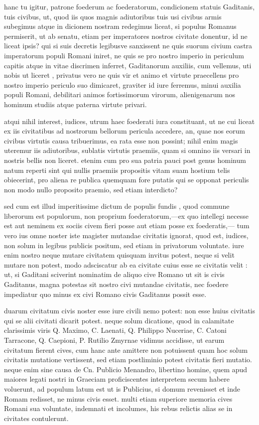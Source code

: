  hanc tu igitur, patrone foederum ac foederatorum, condicionem statuis Gaditanis, tuis civibus, ut, quod iis quos magnis adiutoribus tuis usi civibus armis subegimus atque in dicionem nostram redegimus liceat, si populus Romanus permiserit, ut ab senatu, etiam per imperatores nostros civitate donentur, id ne liceat ipsis? qui si suis decretis legibusve sanxissent ne quis suorum civium castra imperatorum populi Romani iniret, ne quis se pro nostro imperio in periculum capitis atque in vitae discrimen inferret, Gaditanorum auxiliis, cum vellemus, uti nobis ut liceret , privatus vero ne quis vir et animo et virtute praecellens pro nostro imperio periculo suo dimicaret, graviter id iure ferremus, minui auxilia populi Romani, debilitari animos fortissimorum virorum, alienigenarum nos hominum studiis atque paterna virtute privari.

 atqui nihil interest, iudices, utrum haec foederati iura constituant, ut ne cui liceat ex iis civitatibus ad nostrorum bellorum pericula accedere, an, quae nos eorum civibus virtutis causa tribuerimus, ea rata esse non possint; nihil enim magis uteremur iis adiutoribus, sublatis virtutis praemiis, quam si omnino iis versari in nostris bellis non liceret. etenim cum pro sua patria pauci post genus hominum natum reperti sint qui nullis praemiis propositis vitam suam hostium telis obiecerint, pro aliena re publica quemquam fore putatis qui se opponat periculis non modo nullo proposito praemio, sed etiam interdicto?

 sed cum est illud imperitissime dictum de populis fundis , quod commune liberorum est populorum, non proprium foederatorum,—ex quo intellegi necesse est aut neminem ex sociis civem fieri posse aut etiam posse ex foederatis,— tum vero ius omne noster iste magister mutandae civitatis ignorat, quod est, iudices, non solum in legibus publicis positum, sed etiam in privatorum voluntate. iure enim nostro neque mutare civitatem quisquam invitus potest, neque si velit mutare non potest, modo adsciscatur ab ea civitate cuius esse se civitatis velit : ut, si Gaditani sciverint nominatim de aliquo cive Romano ut sit is civis Gaditanus, magna potestas sit nostro civi mutandae civitatis, nec foedere impediatur quo minus ex civi Romano civis Gaditanus possit esse.

 duarum civitatum civis noster esse iure civili nemo potest: non esse huius civitatis qui se alii civitati dicarit potest. neque solum dicatione, quod in calamitate clarissimis viris Q. Maximo, C. Laenati, Q. Philippo Nuceriae, C. Catoni Tarracone, Q. Caepioni, P. Rutilio Zmyrnae vidimus accidisse, ut earum civitatum fierent cives, cum hanc ante amittere non potuissent quam hoc solum civitatis mutatione vertissent, sed etiam postliminio potest civitatis fieri mutatio. neque enim sine causa de Cn. Publicio Menandro, libertino homine, quem apud maiores legati nostri in Graeciam proficiscentes interpretem secum habere voluerunt, ad populum latum est ut is Publicius, si domum revenisset et inde Romam redisset, ne minus civis esset. multi etiam superiore memoria cives Romani sua voluntate, indemnati et incolumes, his rebus relictis alias se in civitates contulerunt.

